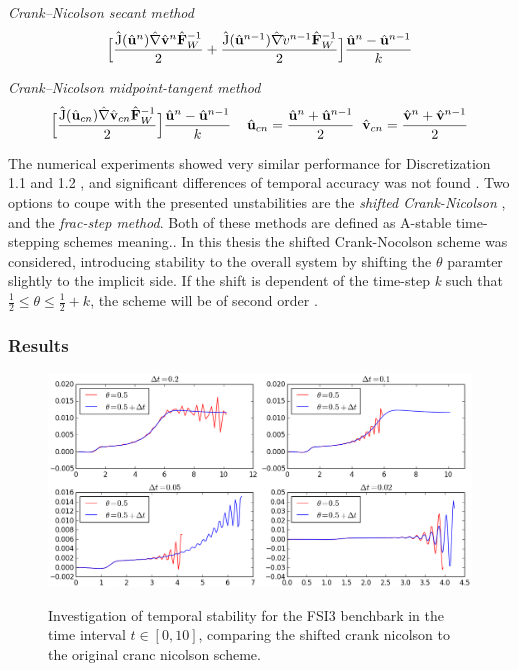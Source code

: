 \begin{discr}
\textit{Crank–Nicolson secant method }
\begin{align*}
\Big[\frac{\text{\^{J}}(\hat{\mathbf{u}}^{n}) \hat{\mathbf{\nabla}} \hat{\mathbf{v}}^{n} \hat{\mathbf{F}}_W^{-1}}{2} 
+ \frac{\text{\^{J}}(\hat{\mathbf{u}}^{n-1}) \hat{\mathbf{\nabla}} \hat{\mathbf{}}v^{n-1} \hat{\mathbf{F}}_W^{-1}}{2} \Big] 
\frac{\hat{\mathbf{u}}^{n} - \hat{\mathbf{u}}^{n-1}}{k}
\end{align*} 
\end{discr}

\begin{discr}
\textit{Crank–Nicolson midpoint-tangent method}
\begin{align*}
\Big[\frac{\text{\^{J}}(\hat{\mathbf{u}}_{cn}) \hat{\mathbf{\nabla}} \hat{\mathbf{v}}_{cn} \hat{\mathbf{F}}_W^{-1}}{2} \Big] 
\frac{\hat{\mathbf{u}}^{n} - \hat{\mathbf{u}}^{n-1}}{k} \hspace{4mm}
\hat{\mathbf{u}}_{cn} = \frac{\hat{\mathbf{u}}^{n} + \hat{\mathbf{u}}^{n-1}}{2} \hspace{2mm}
\hat{\mathbf{v}}_{cn} = \frac{\hat{\mathbf{v}}^{n} + \hat{\mathbf{v}}^{n-1}}{2}
\end{align*} 
\end{discr}

The numerical experiments showed very similar performance for Discretization 1.1 and 1.2 , and significant differences of temporal accuracy was not found \cite{Richter2015}.  Two options to coupe with the presented unstabilities are the \textit{shifted Crank-Nicolson} \cite{Richter2015, Wicka, Wick2013a},   and the \textit{frac-step method}. Both of these methods are defined as A-stable time-stepping schemes meaning..  In this thesis the shifted Crank-Nocolson scheme was considered, introducing stability to the overall system by shifting the $\theta$ paramter slightly to the implicit side. If the shift is dependent of the time-step \textit{k} such that $\frac{1}{2} \leq \theta \leq \frac{1}{2} + k$, the scheme will be of second order \cite{Richter2015}.

\subsubsection*{Results}

\begin{figure}[h!]
 	\centering
    \includegraphics[scale=0.6]{./Fig/thetacheck.png} \\
      \caption{Investigation of temporal stability for the FSI3 benchbark in the time interval $t \in [0, 10]$, comparing the shifted crank nicolson to the original cranc nicolson scheme. }
\end{figure}

